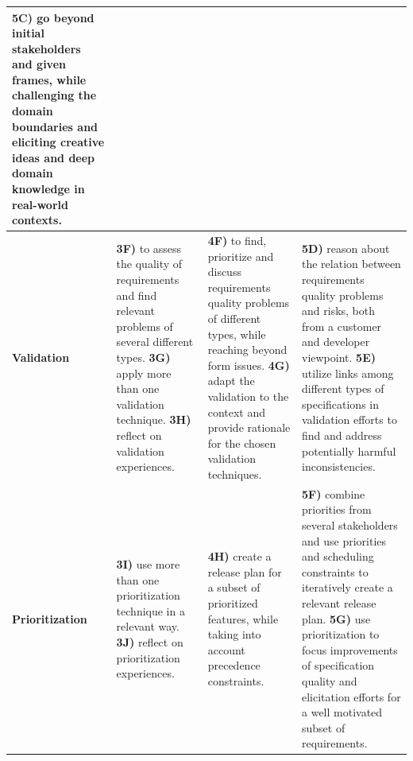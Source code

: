 \documentclass[10pt,a4paper]{article}
\begin{document}
\begin{tabular}{| p{2.3cm} |p{7cm} | p{7cm} | p{7cm} |}
	{\bf 5C)} go beyond initial stakeholders and given frames, while challenging the domain boundaries and eliciting creative ideas and deep domain  knowledge in real-world contexts.
\\ \hline

{\bf Validation}  & 
	
	{\bf 3F)} to assess the quality of requirements and find relevant  problems of several different types. \newline
	{\bf 3G)} apply more than one validation technique. \newline
	{\bf 3H)} reflect on validation experiences.& 
	
	{\bf 4F)} to find, prioritize and discuss requirements quality problems of different types, while reaching beyond form issues. \newline
	{\bf 4G)} adapt the validation to the context and provide rationale for the chosen validation techniques. & 
	
	{\bf 5D)} reason about the relation between requirements quality problems and risks, both from a customer and developer viewpoint. \newline
	{\bf 5E)} utilize links among different types of specifications in validation efforts to find and address potentially harmful inconsistencies. \newline
\\ \hline

{\bf Prioritization}  & 
	
	{\bf 3I)} use more than one prioritization technique in a relevant way. \newline
	{\bf 3J)} reflect on prioritization experiences. &	
	{\bf 4H)} create a release plan for a subset of prioritized features, while taking into account precedence constraints. \newline
& 
	
	{\bf 5F)} combine priorities from several stakeholders and use priorities and scheduling constraints to iteratively create a relevant release plan.\newline	   
	{\bf 5G)} use prioritization to focus improvements of specification quality and elicitation efforts for a well motivated subset of requirements.%
\\ \hline

\end{tabular}
\end{document}

